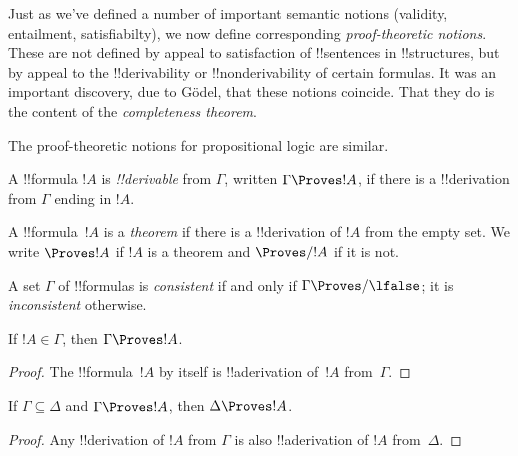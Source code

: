 \documentclass[../../include/open-logic-section]{subfiles}
\begin{document}

\begin{explain}
Just as we've defined a number of important semantic notions
(validity, entailment, satisfiabilty), we now define corresponding
\emph{proof-theoretic notions}.  These are not defined by appeal to
satisfaction of !!{sentence}s in !!{structure}s, but by appeal to the
!!{derivability} or !!{nonderivability} of certain formulas.  It was
an important discovery, due to G\"odel, that these notions coincide.
That they do is the content of the \emph{completeness theorem}.

The proof-theoretic notions for propositional logic are similar.
\end{explain}

\begin{defn}[!!^{derivability}]
A !!{formula} $!A$ is \emph{!!{derivable}} from $\Gamma$, written
$\Gamma \Proves !A$, if there is a !!{derivation} from $\Gamma$ ending
in $!A$.
\end{defn}

\begin{defn}[Theorems]
A !!{formula}~$!A$ is a \emph{theorem} if there is a !!{derivation} of
$!A$ from the empty set.  We write $\Proves !A$ if $!A$ is a theorem
and $\Proves/ !A$ if it is not.
\end{defn}

\begin{defn}[Consistency]
A set $\Gamma$ of !!{formula}s is \emph{consistent} if and only if
$\Gamma\Proves/ \lfalse$; it is \emph{inconsistent} otherwise.
\end{defn}

\begin{prop}[Reflexivity]
If $!A \in \Gamma$, then $\Gamma \Proves !A$.
\end{prop}

\begin{proof}
  The !!{formula}~$!A$ by itself is !!a{derivation} of~$!A$ from~$\Gamma$.
\end{proof}

\begin{prop}[Monotony]
If $\Gamma \subseteq \Delta$ and $\Gamma \Proves !A$, then $\Delta
\Proves !A$.
\end{prop}

\begin{proof}
Any !!{derivation} of $!A$ from $\Gamma$ is also !!a{derivation} of
$!A$ from~$\Delta$.
\end{proof}
\end{document}
